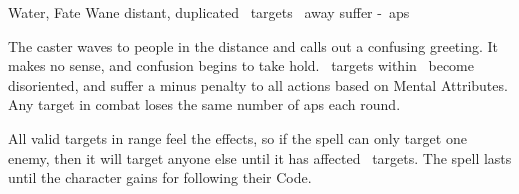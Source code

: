   {Water, Fate}%
  {Wane}%
  {distant, duplicated}%
  {}%
  {\spellArea\ targets \spellRange\ away suffer -~\glspl{ap}}%
  {
    The caster waves to people in the distance and calls out a confusing greeting.
    It makes no sense, and confusion begins to take hold.
    \spellArea\ targets within \spellRange\ become disoriented, and suffer a minus  penalty to all actions based on Mental Attributes.
    Any target in combat loses the same number of \glspl{ap} each round.

    All valid targets in range feel the effects, so if the spell can only target one enemy, then it will target anyone else until it has affected \spellArea\ targets.
    The spell lasts until the character gains  for following their Code.
  }
